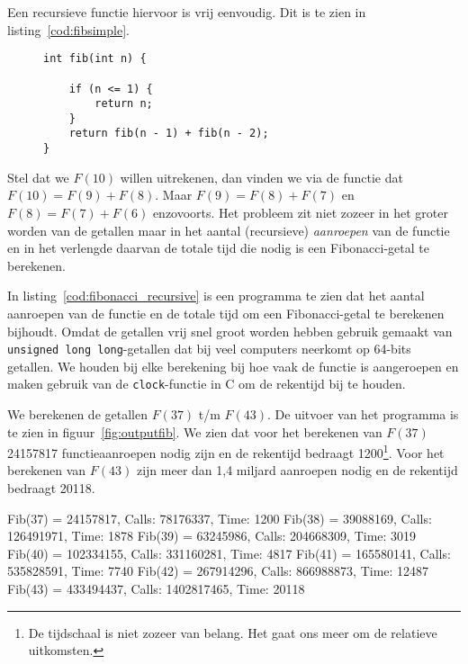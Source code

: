 Een recursieve functie hiervoor is vrij eenvoudig. Dit is te zien in listing~\ref{cod:fibsimple}.

\begin{figure}[!ht]
\begin{lstlisting}[caption=Recursieve functie voor berekenen van Fibonacci-getallen.,label=cod:fibsimple]
int fib(int n) {

    if (n <= 1) {
        return n;
    }
    return fib(n - 1) + fib(n - 2);
}
\end{lstlisting}
\end{figure}

Stel dat we $F(10)$ willen uitrekenen, dan vinden we via de functie dat $F(10)= F(9)+F(8)$. Maar $F(9) =F(8)+F(7)$ en $F(8)=F(7)+F(6)$ enzovoorts. Het probleem zit niet zozeer in het groter worden van de getallen maar in het aantal (recursieve) \textsl{aanroepen} van de functie en in het verlengde daarvan de totale tijd die nodig is een Fibonacci-getal te berekenen.

In listing~\ref{cod:fibonacci_recursive} is een programma te zien dat het aantal aanroepen van de functie en de totale tijd om een Fibonacci-getal te berekenen bijhoudt. Omdat de getallen vrij snel groot worden hebben gebruik gemaakt van \texttt{unsigned long long}-getallen dat bij veel computers neerkomt op 64-bits getallen.
We houden bij elke berekening bij hoe vaak de functie is aangeroepen en maken gebruik van de \texttt{clock}-functie in C om de rekentijd bij te houden.


We berekenen de getallen $F(37)$ t/m $F(43)$. De uitvoer van het programma is te zien in figuur~\ref{fig:outputfib}. We zien dat voor het berekenen van $F(37)$ 24157817 functieaanroepen nodig zijn en de rekentijd bedraagt 1200\footnote{De tijdschaal is niet zozeer van belang. Het gaat ons meer om de relatieve uitkomsten.}. Voor het berekenen van $F(43)$ zijn meer dan 1,4 miljard aanroepen nodig en de rekentijd bedraagt 20118.

\begin{dosbox}[title=Uitvoer van een Fibonacci-programma.,label=fig:outputfib]
Fib(37) = 24157817, Calls: 78176337, Time: 1200
Fib(38) = 39088169, Calls: 126491971, Time: 1878
Fib(39) = 63245986, Calls: 204668309, Time: 3019
Fib(40) = 102334155, Calls: 331160281, Time: 4817
Fib(41) = 165580141, Calls: 535828591, Time: 7740
Fib(42) = 267914296, Calls: 866988873, Time: 12487
Fib(43) = 433494437, Calls: 1402817465, Time: 20118
\end{dosbox}

